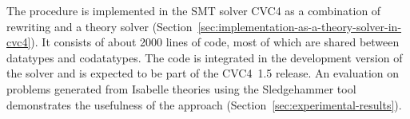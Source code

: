 
The procedure is implemented in the SMT solver CVC4 \cite{barrett-et-al-2011} as a combination
of rewriting and a theory solver (Section~\ref{sec:implementation-as-a-theory-solver-in-cvc4}).
It consists of about 2000 lines of \cpp{} code, %
most of which are shared between datatypes and codatatypes. The code is
integrated in the development version of the solver and is expected to be part
of the CVC4~1.5 release.
%
An evaluation on %
problems generated from Isabelle theories using the Sledgehammer tool \cite{paulson-blanchette-2010}
demonstrates the usefulness of the approach (Section~\ref{sec:experimental-results}).



%










